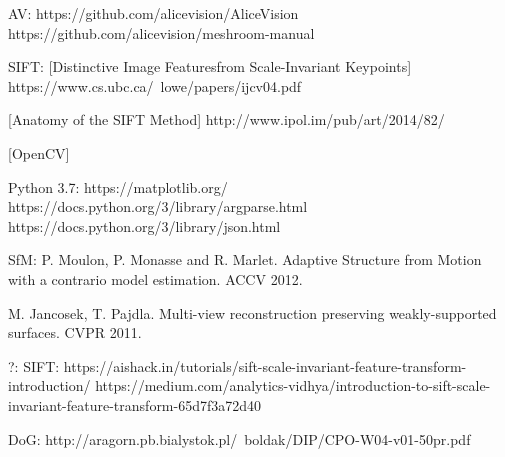 \iffalse
\begin{thebibliography}{9}
\bibitem{latexcompanion}
Michel Goossens, Frank Mittelbach, and Alexander Samarin.
\textit{The \LaTeX\ Companion}.
Addison-Wesley, Reading, Massachusetts, 1993.

\bibitem{einstein}
Albert Einstein.
\textit{Zur Elektrodynamik bewegter K{\"o}rper} . (German)
[\textit{On the electrodynamics of moving bodies}].
Annalen der Physik, 322(10):891–921, 1905.

\bibitem{knuthwebsite}
Knuth: Computers and Typesetting,
\\\texttt{http://www-cs-faculty.stanford.edu/\~{}uno/abcde.html}
\end{thebibliography}
\fi
AV:
https://github.com/alicevision/AliceVision
https://github.com/alicevision/meshroom-manual

SIFT:
[Distinctive Image Featuresfrom Scale-Invariant Keypoints]
https://www.cs.ubc.ca/~lowe/papers/ijcv04.pdf

[Anatomy of the SIFT Method]
http://www.ipol.im/pub/art/2014/82/

[OpenCV]
 
Python 3.7:
https://matplotlib.org/
https://docs.python.org/3/library/argparse.html
https://docs.python.org/3/library/json.html

SfM:
P. Moulon, P. Monasse and R. Marlet. Adaptive Structure from Motion with a contrario model estimation. ACCV 2012.

M. Jancosek, T. Pajdla. Multi-view reconstruction preserving weakly-supported surfaces. CVPR 2011.



?:
SIFT:
https://aishack.in/tutorials/sift-scale-invariant-feature-transform-introduction/
https://medium.com/analytics-vidhya/introduction-to-sift-scale-invariant-feature-transform-65d7f3a72d40

DoG:
http://aragorn.pb.bialystok.pl/~boldak/DIP/CPO-W04-v01-50pr.pdf
